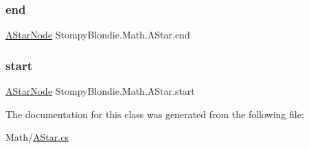 \subsubsection{\texorpdfstring{end}{end}}
{\footnotesize\ttfamily \mbox{\hyperlink{class_stompy_blondie_1_1_math_1_1_a_star_node}{A\+Star\+Node}} Stompy\+Blondie.\+Math.\+A\+Star.\+end\hspace{0.3cm}{\ttfamily [protected]}}

\mbox{\label{class_stompy_blondie_1_1_math_1_1_a_star_aa83953b9f5eccd538d5a64c9cb4eb51f}} 
\subsubsection{\texorpdfstring{start}{start}}
{\footnotesize\ttfamily \mbox{\hyperlink{class_stompy_blondie_1_1_math_1_1_a_star_node}{A\+Star\+Node}} Stompy\+Blondie.\+Math.\+A\+Star.\+start\hspace{0.3cm}{\ttfamily [protected]}}



The documentation for this class was generated from the following file\+:\begin{DoxyCompactItemize}
\item 
Math/\mbox{\hyperlink{_a_star_8cs}{A\+Star.\+cs}}\end{DoxyCompactItemize}
